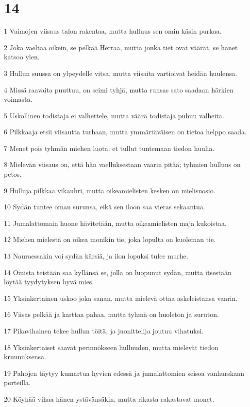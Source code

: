 \chapter{14}

\par 1 Vaimojen viisaus talon rakentaa, mutta hulluus sen omin käsin purkaa.
\par 2 Joka vaeltaa oikein, se pelkää Herraa, mutta jonka tiet ovat väärät, se hänet katsoo ylen.
\par 3 Hullun suussa on ylpeydelle vitsa, mutta viisaita vartioivat heidän huulensa.
\par 4 Missä raavaita puuttuu, on seimi tyhjä, mutta runsas sato saadaan härkien voimasta.
\par 5 Uskollinen todistaja ei valhettele, mutta väärä todistaja puhuu valheita.
\par 6 Pilkkaaja etsii viisautta turhaan, mutta ymmärtäväisen on tietoa helppo saada.
\par 7 Menet pois tyhmän miehen luota: et tullut tuntemaan tiedon huulia.
\par 8 Mielevän viisaus on, että hän vaelluksestaan vaarin pitää; tyhmien hulluus on petos.
\par 9 Hulluja pilkkaa vikauhri, mutta oikeamielisten kesken on mielisuosio.
\par 10 Sydän tuntee oman surunsa, eikä sen iloon saa vieras sekaantua.
\par 11 Jumalattomain huone hävitetään, mutta oikeamielisten maja kukoistaa.
\par 12 Miehen mielestä on oikea monikin tie, joka lopulta on kuoleman tie.
\par 13 Nauraessakin voi sydän kärsiä, ja ilon lopuksi tulee murhe.
\par 14 Omista teistään saa kyllänsä se, jolla on luopunut sydän, mutta itsestään löytää tyydytyksen hyvä mies.
\par 15 Yksinkertainen uskoo joka sanan, mutta mielevä ottaa askeleistansa vaarin.
\par 16 Viisas pelkää ja karttaa pahaa, mutta tyhmä on huoleton ja suruton.
\par 17 Pikavihainen tekee hullun töitä, ja juonittelija joutuu vihatuksi.
\par 18 Yksinkertaiset saavat perinnökseen hulluuden, mutta mielevät tiedon kruunuksensa.
\par 19 Pahojen täytyy kumartua hyvien edessä ja jumalattomien seisoa vanhurskaan porteilla.
\par 20 Köyhää vihaa hänen ystävänsäkin, mutta rikasta rakastavat monet.
